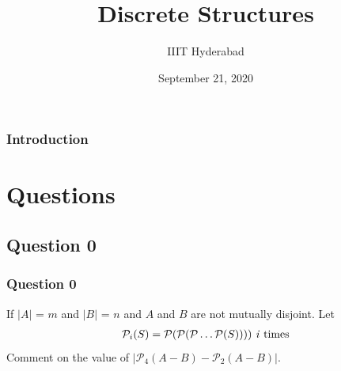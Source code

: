 \documentclass[xcolor=svgnames]{beamer}
\title[Discrete Structures]{Discrete Structures} %
\author{IIIT Hyderabad} %
\institute[] %
{
Monsoon 2020 \\ %
\medskip
\textit{Tutorial 2} %
}
\date{September 21, 2020} %
\begin{document}
\begin{frame}
\titlepage %
\end{frame}

\begin{frame}
\frametitle{Introduction} %
\tableofcontents %
\end{frame}



\section{Questions}

\subsection{Question 0}
\begin{frame}
\frametitle{Question 0}
If $|A|$ = $m$ and $|B|$ = $n$ and $A$ and $B$ are not mutually disjoint. Let
\begin{align*}
\mathcal{P}_i(S) = \mathcal{P}(\mathcal{P}(\mathcal{P}\ldots \mathcal{P}(S)))) \text{  \textit{i}}  \text{    times}
\end{align*}
Comment on the value of $|\mathcal{P}_4(A-B) -  \mathcal{P}_2(A-B)|$.
\end{frame}


\end{document}
